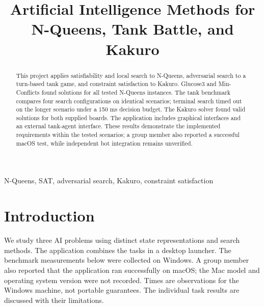 \documentclass[conference]{IEEEtran}
\begin{document}
\title{Artificial Intelligence Methods for N-Queens, Tank Battle, and Kakuro}
\author{
    \and
    \and
    \and
    }
\maketitle
\begin{abstract}
    This project applies satisfiability and local search to N-Queens, adversarial search to a turn-based tank game, and constraint satisfaction to Kakuro. Glucose3 and Min-Conflicts found solutions for all tested N-Queens instances. The tank benchmark compares four search configurations on identical scenarios; terminal search timed out on the longer scenario under a 150 ms decision budget. The Kakuro solver found valid solutions for both supplied boards. The application includes graphical interfaces and an external tank-agent interface. These results demonstrate the implemented requirements within the tested scenarios; a group member also reported a successful macOS test, while independent bot integration remains unverified.
\end{abstract}
\begin{IEEEkeywords}N-Queens, SAT, adversarial search, Kakuro, constraint satisfaction\end{IEEEkeywords}
\section{Introduction}
We study three AI problems using distinct state representations and search methods. The application combines the tasks in a desktop launcher. The benchmark measurements below were collected on Windows. A group member also reported that the application ran successfully on macOS; the Mac model and operating system version were not recorded. Times are observations for the Windows machine, not portable guarantees. The individual task results are discussed with their limitations.
\end{document}
